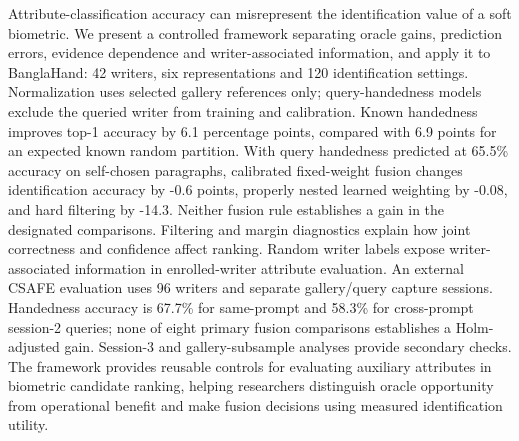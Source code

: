 Attribute-classification accuracy can misrepresent the identification value of a soft biometric. We present a controlled framework separating oracle gains, prediction errors, evidence dependence and writer-associated information, and apply it to BanglaHand: 42 writers, six representations and 120 identification settings. Normalization uses selected gallery references only; query-handedness models exclude the queried writer from training and calibration. Known handedness improves top-1 accuracy by 6.1 percentage points, compared with 6.9 points for an expected known random partition. With query handedness predicted at 65.5\% accuracy on self-chosen paragraphs, calibrated fixed-weight fusion changes identification accuracy by -0.6 points, properly nested learned weighting by -0.08, and hard filtering by -14.3. Neither fusion rule establishes a gain in the designated comparisons. Filtering and margin diagnostics explain how joint correctness and confidence affect ranking. Random writer labels expose writer-associated information in enrolled-writer attribute evaluation. An external CSAFE evaluation uses 96 writers and separate gallery/query capture sessions. Handedness accuracy is 67.7\% for same-prompt and 58.3\% for cross-prompt session-2 queries; none of eight primary fusion comparisons establishes a Holm-adjusted gain. Session-3 and gallery-subsample analyses provide secondary checks. The framework provides reusable controls for evaluating auxiliary attributes in biometric candidate ranking, helping researchers distinguish oracle opportunity from operational benefit and make fusion decisions using measured identification utility.
